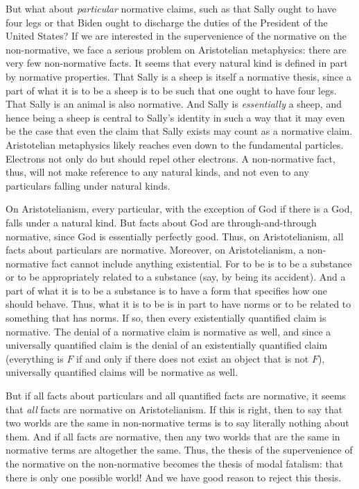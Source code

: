 But what about \textit{particular} normative claims, such as that Sally ought to have four legs
or that Biden ought to discharge the duties of the President of the United States? If we are
interested in the supervenience of the normative on the non-normative, we face a serious problem on
Aristotelian metaphysics: there are very few non-normative facts. It seems that every natural kind
is defined in part by normative properties. That Sally is a sheep is itself a normative thesis,
since a part of what it is to be a sheep is to be such that one ought to have four legs. That Sally
is an animal is also normative. And Sally is \textit{essentially} a sheep, and hence being a sheep
is central to Sally's identity in such a way that it may even be the case that even the claim that
Sally exists may count as a normative claim. Aristotelian metaphysics likely reaches even down to the fundamental
particles. Electrons not only do but should repel other electrons. A non-normative fact, thus, will
not make reference to any natural kinds, and not even to any particulars falling under natural
kinds.

On Aristotelianism, every particular, with the exception of God if there is a God, falls under a natural kind.
But facts about God are through-and-through normative, since God is essentially perfectly good. Thus,
on Aristotelianism, all facts about particulars are normative. 
Moreover, on Aristotelianism, a non-normative fact cannot include anything existential.
For to be is to be a substance or to be appropriately related to a substance (say, by being its accident).
And a part of what it is to be a substance is to have a form that specifies how one should behave. Thus,
what it is to be is in part to have norms or to be related to something that has norms. If so, then every
existentially quantified claim is normative. The denial of a normative claim is normative as well, and
since a universally quantified claim is the denial of an existentially quantified claim (everything is
$F$ if and only if there does not exist an object that is not $F$), universally quantified claims 
will be normative as well. 

But if all facts about particulars and all quantified facts are normative, it seems that \textit{all} facts
are normative on Aristotelianism.  If this is right, then to say that two worlds are the same in non-normative terms 
is to say literally nothing about them. And if all facts are normative, then any two worlds that are the same
in normative terms are altogether the same. Thus, the thesis of the supervenience of the normative on the
non-normative becomes the thesis of modal fatalism: that there is only one possible world! And we have good
reason to reject this thesis.


